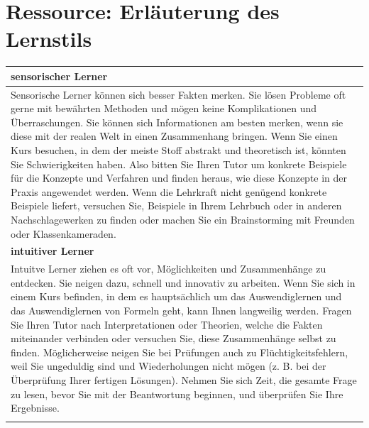 \chapter{Ressource: Erläuterung des Lernstils}   \label{tab:/Anhang_Erläuterung_des_Lernstils} 

\begingroup
  \footnotesize  
\begin{longtable}{|m{15cm}|}
  \hline \hline 
  \rowcolor[HTML]{EFEFEF}                                         
   
  \centering \arraybackslash \textbf{sensorischer Lerner}  \\ 
  \hline \hline 
  Sensorische Lerner können sich besser Fakten merken. 
  Sie lösen Probleme oft gerne mit bewährten Methoden und mögen 
  keine Komplikationen und Überraschungen. 
  Sie können sich Informationen am besten merken, wenn sie diese mit 
  der realen Welt in einen Zusammenhang bringen. Wenn Sie einen Kurs besuchen, 
  in dem der meiste Stoff  abstrakt und theoretisch ist, könnten Sie Schwierigkeiten haben.
  Also bitten Sie Ihren Tutor um konkrete Beispiele für die Konzepte und Verfahren und finden
  heraus, wie diese Konzepte in der Praxis angewendet werden. Wenn die Lehrkraft nicht 
  genügend konkrete Beispiele liefert, versuchen Sie, Beispiele in Ihrem Lehrbuch oder in 
  anderen Nachschlagewerken zu finden oder machen Sie ein Brainstorming mit Freunden
  oder Klassenkameraden.\\\hline 
  \hline  
  \rowcolor[HTML]{EFEFEF}                                         
   
  \centering \arraybackslash \textbf{intuitiver Lerner}  \\ 
  \hline \hline 
  Intuitve Lerner ziehen es oft vor, Möglichkeiten und Zusammenhänge zu entdecken.
  Sie neigen dazu, schnell und innovativ zu arbeiten.
  Wenn Sie sich in einem Kurs befinden, in dem es hauptsächlich um das Auswendiglernen
  und das Auswendiglernen von Formeln geht, kann Ihnen langweilig werden.
  Fragen Sie Ihren Tutor nach Interpretationen oder Theorien, welche die Fakten
  miteinander verbinden oder versuchen Sie, diese Zusammenhänge selbst zu finden.
  Möglicherweise neigen Sie bei Prüfungen auch zu Flüchtigkeitsfehlern, weil Sie
  ungeduldig sind und Wiederholungen nicht mögen (z. B. bei der Überprüfung Ihrer
  fertigen Lösungen). Nehmen Sie sich Zeit, die gesamte Frage zu lesen, bevor Sie mit
  der Beantwortung beginnen, und überprüfen Sie Ihre Ergebnisse.\\\hline 
  \hline     
  \rowcolor[HTML]{EFEFEF}                                         


\end{longtable}

